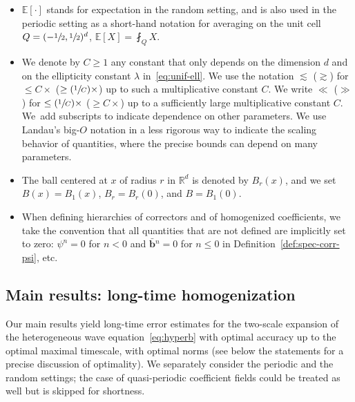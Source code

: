 \documentclass[10pt]{amsart}
\newcommand{\Psfrac}[2]{(\sfrac{#1}{#2})}
\theoremstyle{plain}
\theoremstyle{definition}
\numberwithin{equation}{section}
\newcommand{\R}{\mathbb R}
\newcommand{\bb}{{\boldsymbol b}}
\newcommand{\expec}[1]{\mathbb{E}\left[ #1 \right]}
\begin{document}
\begin{itemize}
\item $\expec{\cdot}$ stands for expectation in the random setting, and is also used in the periodic setting as a short-hand notation for averaging on the unit cell $Q=(-\sfrac12,\sfrac12)^d$, $\expec{X}=\fint_Q X$.
\item We denote by $C\ge1$ any constant that only depends on the dimension $d$ and on the ellipticity constant $\lambda$ in~\eqref{eq:unif-ell}. We use the notation $\lesssim$ (\resp $\gtrsim$) for $\le C\times$ (\resp $\ge\Psfrac1C\times$) up to such a multiplicative constant $C$. We write $\ll$ (\resp $\gg$) for $\le \Psfrac1C\times$ (\resp $\ge C\times$) up to a sufficiently large multiplicative constant $C$. We~add subscripts to indicate dependence on other parameters. {We use Landau's big-$O$ notation in a less rigorous way to indicate the scaling behavior of quantities, where the precise bounds can depend on many parameters.}
\item The ball centered at $x$ of radius $r$ in $\R^d$ is denoted by $B_r(x)$, and we set $B(x)=B_1(x)$, $B_r=B_r(0)$, and $B=B_1(0)$.
\item When defining hierarchies of correctors and of homogenized coefficients, we take the convention that all quantities that are not defined are implicitly set to zero: \eg $\psi^n=0$ for $n<0$ and $\bar\bb{}^n=0$ for $n\le0$ in Definition~\ref{def:spec-corr-psi}, etc.
\end{itemize}

\subsection{Main results: long-time homogenization}\label{sec:main-res}
Our main results yield long-time error estimates for the two-scale expansion of the heterogeneous wave
equation~\eqref{eq:hyperb} with optimal accuracy up to the optimal maximal timescale, { with optimal norms (see below the statements for a precise discussion of optimality)}. We separately consider the periodic and the random settings; the case of quasi-periodic coefficient fields could be treated as well but is skipped for shortness.
\end{document}
